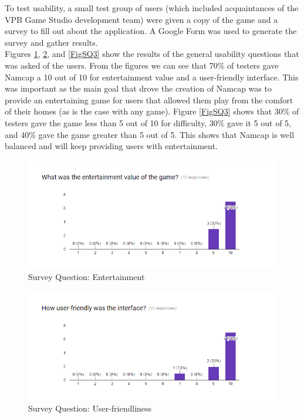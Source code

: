 \documentclass[12pt, titlepage]{article}
\begin{document}
To test usability, a small test group of users (which included acquaintances of the VPB Game Studio development team) were given a copy of the game and a survey to fill out about the application. A Google Form was used to generate the survey and gather results.\\

\noindent Figures \ref{FigSQ1}, \ref{FigSQ2}, and \ref{FigSQ3} show the results of the general usability questions that was asked of the users. From the figures we can see that 70\% of testers gave Namcap a 10 out of 10 for entertainment value and a user-friendly interface. This was important as the main goal that drove the creation of Namcap was to provide an entertaining game for users that allowed them play from the comfort of their homes (as is the case with any game). Figure \ref{FigSQ3} shows that 30\% of testers gave the game less than 5 out of 10 for difficulty, 30\% gave it 5 out of 5, and 40\% gave the game greater than 5 out of 5. This shows that Namcap is well balanced and will keep providing users with entertainment.

\begin{figure}[H]
\centering
\includegraphics[width=1.0\textwidth]{SurveyQuestion1.png}
\caption{Survey Question: Entertainment}
\label{FigSQ1}
\end{figure}

\begin{figure}[H]
\centering
\includegraphics[width=1.0\textwidth]{SurveyQuestion2.png}
\caption{Survey Question: User-friendliness}
\label{FigSQ2}
\end{figure}
\end{document}

